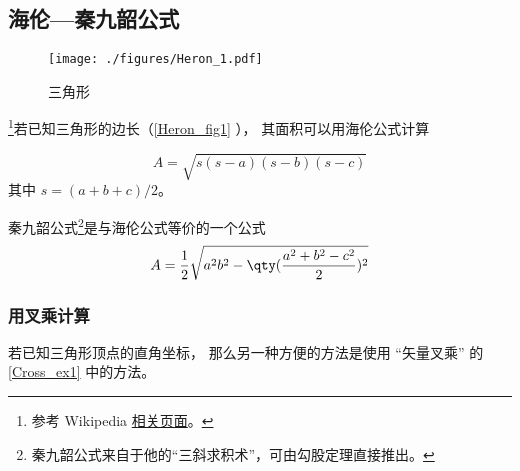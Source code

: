 

\subsection{海伦—秦九韶公式}
\begin{figure}[ht]
\centering
\texttt{[image: ./figures/Heron\_1.pdf]}
\caption{三角形} \label{Heron_fig1}
\end{figure}
\footnote{参考 Wikipedia \href{https://en.wikipedia.org/wiki/Heron's_formula}{相关页面}。}若已知三角形的边长（\autoref{Heron_fig1} ）， 其面积可以用海伦公式计算

\begin{equation}\label{Heron_eq1}
A = \sqrt{s(s-a)(s-b)(s-c)}
\end{equation}
其中 $s = (a+b+c)/2$。

秦九韶公式\footnote{秦九韶公式来自于他的“三斜求积术”，可由勾股定理直接推出。}是与海伦公式等价的一个公式
\begin{equation}
A = \frac{1}{2}\sqrt{a^2b^2-\qty(\frac{a^2+b^2-c^2}{2})^2}
\end{equation}

\subsubsection{用叉乘计算}
若已知三角形顶点的直角坐标， 那么另一种方便的方法是使用 “矢量叉乘” 的\autoref{Cross_ex1} 中的方法。

